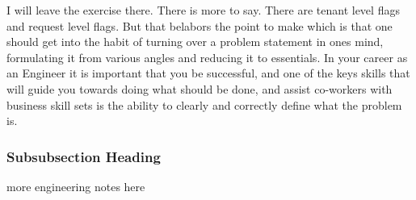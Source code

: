 I will leave the exercise there. There is more to say. There are tenant level flags and request level flags. But that belabors the point to make
which is that
one should get into the habit of turning over a problem statement in ones mind, formulating it from various angles and reducing it to
essentials. In your career as an Engineer it is important that you be successful, and one of the keys skills that will guide you towards doing what should
be done, and assist co-workers with business skill sets is the ability to clearly and correctly define what the problem is.


\subsubsection{Subsubsection Heading}
more engineering notes here

